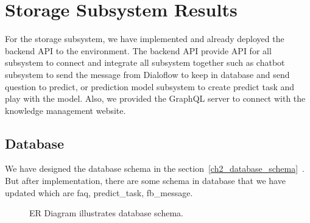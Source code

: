 \documentclass[12pt,oneside,openright,a4paper]{cpe-english-project}
\begin{document}
\pagebreak
\section{Storage Subsystem Results}
For the storage subsystem, we have implemented and already deployed the backend API to the environment.
The backend API provide API for all subsystem to connect and integrate all subsystem together such as
chatbot subsystem to send the message from Dialoflow to keep in database and send question to predict,
or prediction model subsystem to create predict task and play with the model.
Also, we provided the GraphQL server to connect with the knowledge management website.

\subsection{Database}
We have designed the database schema in the section~\ref*{ch2_database_schema}~.
But after implementation, there are some schema in database that we have updated which are
faq, predict\_task, fb\_message.

\begin{figure}[!h]\centering
{}
\caption{ER Diagram illustrates database schema.
}\label{fig:ER Diagram illustrates database schema in result.}
\end{figure}
\end{document}

